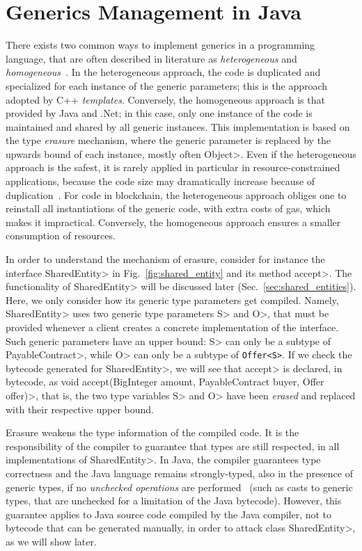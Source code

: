 \section{Generics Management in Java}\label{sec:java_generics}

There exists two common ways to implement generics in a programming language,
that are often described in literature as \emph{heterogeneous}
and \emph{homogeneous}~\cite{generics_categories}.
In the heterogeneous approach, the code is duplicated and specialized for each instance
of the generic parameters; this is the approach adopted by C++ \emph{templates}.
Conversely, the homogeneous approach is that provided by Java and .Net; in this case,
only one instance of the code is maintained and shared by all generic instances.
This implementation is based on the type \emph{erasure} mechanism, where the generic parameter
is replaced by the upwards bound of each instance, mostly often \<Object>.
Even if the heterogeneous approach is the safest, it is rarely applied in particular
in resource-constrained applications, because the code size may dramatically increase
because of duplication~\cite{generics_embedded_systems}. For code in blockchain,
the heterogeneous approach obliges one to reinstall all instantiations of the generic code,
with extra costs of gas, which makes it impractical.
Conversely, the homogeneous approach ensures a smaller consumption of resources.

In order to understand the mechanism of erasure, consider for instance
the interface \<SharedEntity> in Fig.~\ref{fig:shared_entity} and its method \<accept>.
The functionality of \<SharedEntity> will be discussed later (Sec.~\ref{sec:shared_entities}).
Here, we only consider how its generic type parameters get compiled.
Namely, \<SharedEntity> uses two generic type parameters \<S> and \<O>, that must be provided
whenever a client creates a concrete implementation of the interface.
Such generic parameters have an upper bound: \<S> can only be a subtype of \<PayableContract>,
while \<O> can only be a subtype of {\codesize\texttt{Offer<S>}}. If we check the bytecode
generated for \<SharedEntity>, we will see that \<accept> is declared, in bytecode, as
\<void accept(BigInteger amount, PayableContract buyer, Offer offer)>, that is,
the two type variables \<S> and \<O> have been \emph{erased} and replaced with their
respective upper bound.

Erasure weakens the type information of the compiled code. It is the responsibility of the
compiler to guarantee that types are still respected, in all implementations of \<SharedEntity>.
In Java, the compiler guarantees type correctness and the Java language remains strongly-typed,
also in the presence of generic types,
if no \emph{unchecked operations} are performed~\cite{NaftalinW06} (such as casts to generic types,
that are unchecked for a limitation of the Java bytecode).
However, this guarantee applies to Java source code compiled by the Java compiler,
not to bytecode that can be generated manually, in order to attack class \<SharedEntity>,
as we will show later.
